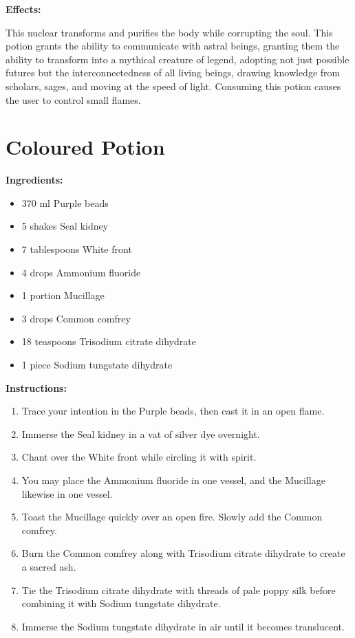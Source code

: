 \documentclass{article}
\begin{document}
\textbf{Effects:}

This nuclear transforms and purifies the body while corrupting the soul. This potion grants the ability to communicate with astral beings, granting them the ability to transform into a mythical creature of legend, adopting not just possible futures but the interconnectedness of all living beings, drawing knowledge from scholars, sages, and moving at the speed of light. Consuming this potion causes the user to control small flames.

\newpage
\section*{Coloured Potion}

\textbf{Ingredients:}

\begin{itemize}
  \item 370 ml Purple beads
  \item 5 shakes Seal kidney
  \item 7 tablespoons White front
  \item 4 drops Ammonium fluoride
  \item 1 portion Mucillage
  \item 3 drops Common comfrey
  \item 18 teaspoons Trisodium citrate dihydrate
  \item 1 piece Sodium tungstate dihydrate
\end{itemize}

\textbf{Instructions:}

\begin{enumerate}
  \item Trace your intention in the Purple beads, then cast it in an open flame.
  \item Immerse the Seal kidney in a vat of silver dye overnight.
  \item Chant over the White front while circling it with spirit.
  \item You may place the Ammonium fluoride in one vessel, and the Mucillage likewise in one vessel.
  \item Toast the Mucillage quickly over an open fire. Slowly add the Common comfrey.
  \item Burn the Common comfrey along with Trisodium citrate dihydrate to create a sacred ash.
  \item Tie the Trisodium citrate dihydrate with threads of pale poppy silk before combining it with Sodium tungstate dihydrate.
  \item Immerse the Sodium tungstate dihydrate in air until it becomes translucent.
\end{enumerate}
\end{document}
